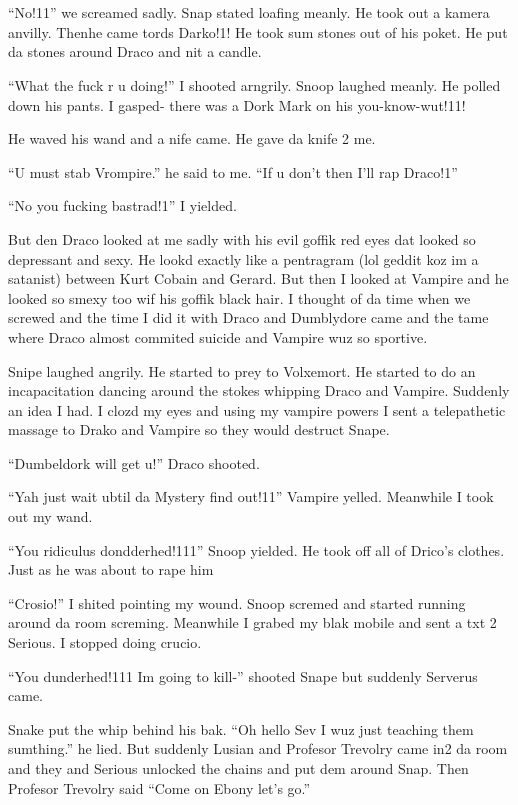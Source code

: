 \section{}



\enquote{No!11} we screamed sadly. Snap stated loafing meanly. He took out a kamera anvilly. Then\dotfill\newline he came tords Darko!1! He took sum stones out of his poket. He put da stones around Draco and nit a candle.

\enquote{What the fuck r u doing!} I shooted arngrily. Snoop laughed meanly. He polled down his pants. I gasped- there was a Dork Mark on his you-know-wut!11!

He waved his wand and a nife came. He gave da knife 2 me.

\enquote{U must stab Vrompire.} he said to me. \enquote{If u don't then I'll rap Draco!1}

\enquote{No you fucking bastrad!1} I yielded.

But den Draco looked at me sadly with his evil goffik red eyes dat looked so depressant and sexy. He lookd exactly like a pentragram (lol geddit koz im a satanist) between Kurt Cobain and Gerard. But then I looked at Vampire and he looked so smexy too wif his goffik black hair. I thought of da time when we screwed and the time I did it with Draco and Dumblydore came and the tame where Draco almost commited suicide and Vampire wuz so sportive.

Snipe laughed angrily. He started to prey to Volxemort. He started to do an incapacitation dancing around the stokes whipping Draco and Vampire. Suddenly an idea I had. I clozd my eyes and using my vampire powers I sent a telepathetic massage to Drako and Vampire so they would destruct Snape.

\enquote{Dumbeldork will get u!} Draco shooted.

\enquote{Yah just wait ubtil da Mystery find out!11} Vampire yelled. Meanwhile I took out my wand.

\enquote{You ridiculus dondderhed!111} Snoop yielded. He took off all of Drico's clothes. Just as he was about to rape him\dotfill

\enquote{Crosio!} I shited pointing my wound. Snoop scremed and started running around da room screming. Meanwhile I grabed my blak mobile and sent a txt 2 Serious. I stopped doing crucio.

\enquote{You dunderhed!111 Im going to kill-} shooted Snape but suddenly Serverus came.

Snake put the whip behind his bak. \enquote{Oh hello Sev I wuz just teaching them sumthing.} he lied. But suddenly Lusian and Profesor Trevolry came in2 da room and they and Serious unlocked the chains and put dem around Snap. Then Profesor Trevolry said \enquote{Come on Ebony let's go.}
